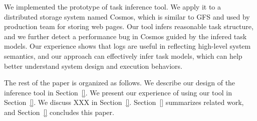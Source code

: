 We implemented the prototype of task inference tool.
We apply it to a distributed storage system
named Cosmos, which is similar to GFS and used by production 
team for storing web pages. Our tool infers reasonable
task structure, and we further detect a performance
bug in Cosmos guided by the infered task models. 
Our experience shows that logs are useful in reflecting
high-level system semantics, and our approach can effectively
infer task models, which can help better understand system 
design and execution behaviors.

The rest of the paper is organized as follows. We describe
our design of the inference tool in Section~\ref{}. 
We present our experience of using our tool in Section~\ref{}.
We discuss XXX in Section~\ref{}. Section~\ref{} summarizes
related work, and Section~\ref{} concludes this paper.











